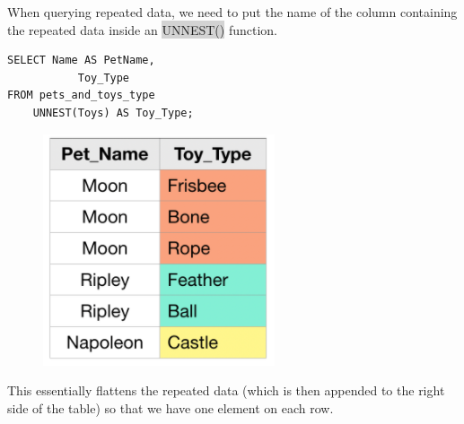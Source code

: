 \documentclass[11pt]{article}
\begin{document}
{{{{{{{{When querying repeated data, we need to put the name of the column containing the repeated data inside an \colorbox{lightgray}{UNNEST()} function.
\begin{lstlisting}
SELECT Name AS PetName,
	       Toy_Type
FROM pets_and_toys_type
	UNNEST(Toys) AS Toy_Type;
\end{lstlisting}
\begin{figure}[H]
\includegraphics[scale = 0.9]{6_6}
\centering
\end{figure}
\vspace{-4mm}
This essentially flattens the repeated data (which is then appended to the right side of the table) so that we have one element on each row.

}}}}}}}}
\end{document}
